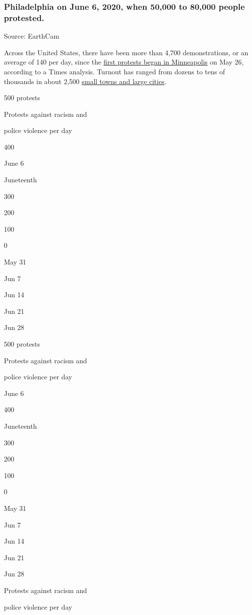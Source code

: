 \hypertarget{philadelphia-on-june-6-2020-when-50000-to-80000-people-protested}{%
\subsubsection{Philadelphia on June 6, 2020, when 50,000 to 80,000
people
protested.}\label{philadelphia-on-june-6-2020-when-50000-to-80000-people-protested}}

Source: EarthCam

Across the United States, there have been more than 4,700
demonstrations, or an average of 140 per day, since the
\href{https://www.nytimes3xbfgragh.onion/article/george-floyd-protests-timeline.html}{first
protests began in Minneapolis} on May 26, according to a Times analysis.
Turnout has ranged from dozens to tens of thousands in about 2,500
\href{https://www.nytimes3xbfgragh.onion/interactive/2020/06/13/us/george-floyd-protests-cities-photos.html}{small
towns and large cities}.

500 protests

Protests against racism and

police violence per day

400

June 6

Juneteenth

300

200

100

0

May 31

Jun 7

Jun 14

Jun 21

Jun 28

500 protests

Protests against racism and

police violence per day

June 6

400

Juneteenth

300

200

100

0

May 31

Jun 7

Jun 14

Jun 21

Jun 28

Protests against racism and

police violence per day

